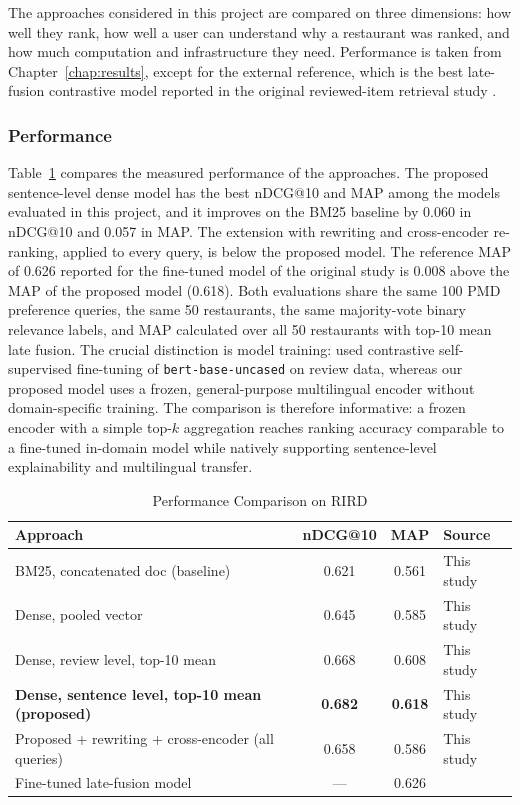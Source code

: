 The approaches considered in this project are compared on three dimensions: how well they rank, how well a user can understand why a restaurant was ranked, and how much computation and infrastructure they need. Performance is taken from Chapter~\ref{chap:results}, except for the external reference, which is the best late-fusion contrastive model reported in the original reviewed-item retrieval study \citep{abdollahpour2023}.

\subsubsection{Performance}
\label{sec:discperformance}

Table~\ref{tab:discperf} compares the measured performance of the approaches. The proposed sentence-level dense model has the best nDCG@10 and MAP among the models evaluated in this project, and it improves on the BM25 baseline by 0.060 in nDCG@10 and 0.057 in MAP. The extension with rewriting and cross-encoder re-ranking, applied to every query, is below the proposed model. The reference MAP of 0.626 reported for the fine-tuned model of the original study is 0.008 above the MAP of the proposed model (0.618). Both evaluations share the same 100 PMD preference queries, the same 50 restaurants, the same majority-vote binary relevance labels, and MAP calculated over all 50 restaurants with top-10 mean late fusion. The crucial distinction is model training: \citet{abdollahpour2023} used contrastive self-supervised fine-tuning of \texttt{bert-base-uncased} on review data, whereas our proposed model uses a frozen, general-purpose multilingual encoder without domain-specific training. The comparison is therefore informative: a frozen encoder with a simple top-$k$ aggregation reaches ranking accuracy comparable to a fine-tuned in-domain model while natively supporting sentence-level explainability and multilingual transfer.

\begin{table}[htbp]
\centering
\caption{Performance Comparison on RIRD}
\label{tab:discperf}
\small
\begin{tabular}{|p{}|c|c|p{}|}
\hline
\textbf{Approach} & \textbf{nDCG@10} & \textbf{MAP} & \textbf{Source} \\
\hline
BM25, concatenated doc (baseline) & 0.621 & 0.561 & This study \\
\hline
Dense, pooled vector & 0.645 & 0.585 & This study \\
\hline
Dense, review level, top-10 mean & 0.668 & 0.608 & This study \\
\hline
\textbf{Dense, sentence level, top-10 mean (proposed)} & \textbf{0.682} & \textbf{0.618} & This study \\
\hline
Proposed + rewriting + cross-encoder (all queries) & 0.658 & 0.586 & This study \\
\hline
Fine-tuned late-fusion model & --- & 0.626 & \citet{abdollahpour2023} \\
\hline
\end{tabular}
\end{table}


